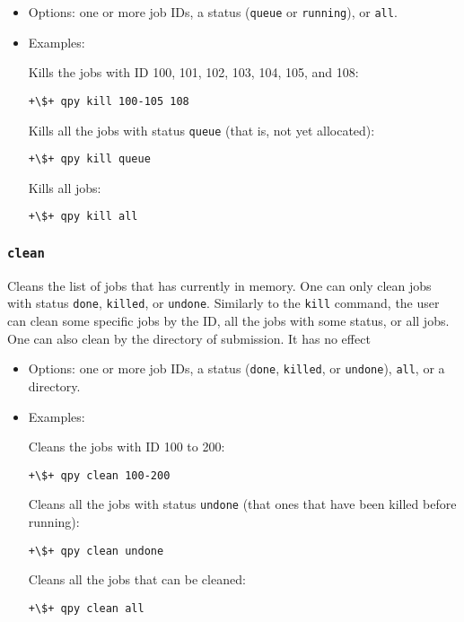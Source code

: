 \documentclass[a4paper,12pt]{article}
\begin{document}
\begin{itemize}
\item Options:
  one or more job IDs, a status (\texttt{queue} or \texttt{running}), or \texttt{all}.

\item Examples:

  Kills the jobs with ID 100, 101, 102, 103, 104, 105, and 108:

  \begin{lstlisting}[style=BashStyle]
+\$+ qpy kill 100-105 108
  \end{lstlisting}

  Kills all the jobs with status \texttt{queue} (that is, not yet allocated):

  \begin{lstlisting}[style=BashStyle]
+\$+ qpy kill queue
  \end{lstlisting}

  Kills all jobs:

  \begin{lstlisting}[style=BashStyle]
+\$+ qpy kill all
  \end{lstlisting}
\end{itemize}

\subsubsection{\texttt{clean}}

Cleans the list of jobs that \qpy{} has currently in memory.
One can only clean jobs with status \texttt{done}, \texttt{killed}, or \texttt{undone}.
Similarly to the \texttt{kill} command, the user can clean some specific jobs by the ID, all the jobs with some status, or all jobs.
One can also clean by the directory of submission.
It has no effect

\begin{itemize}
\item Options:
  one or more job IDs, a status (\texttt{done}, \texttt{killed}, or \texttt{undone}), \texttt{all}, or a directory.

\item Examples:

  Cleans the jobs with ID 100 to 200:

  \begin{lstlisting}[style=BashStyle]
+\$+ qpy clean 100-200
  \end{lstlisting}

  Cleans all the jobs with status \texttt{undone} (that ones that have been killed before running):

  \begin{lstlisting}[style=BashStyle]
+\$+ qpy clean undone
  \end{lstlisting}

  Cleans all the jobs that can be cleaned:

  \begin{lstlisting}[style=BashStyle]
+\$+ qpy clean all
  \end{lstlisting}
\end{itemize}
\end{document}
